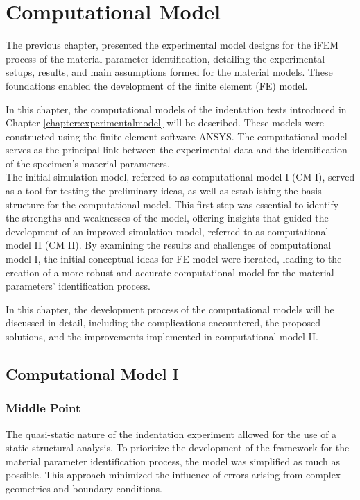 
\chapter{Computational Model} %
\label{chapter:computationalmodel} %

The previous chapter, presented the experimental model designs for the iFEM process of the material 
parameter identification, detailing the experimental setups, results, and main assumptions 
formed for the material models. These foundations enabled the development of the finite element (FE) model.

In this chapter, the computational models of the indentation tests introduced in Chapter \ref{chapter:experimentalmodel} 
will be described. These models were constructed using the finite element software ANSYS. 
The computational model serves as the principal link between the experimental data and the identification of the 
specimen's material parameters.\\  

The initial simulation model, referred to as computational model I (CM I), served as a tool 
for testing the preliminary ideas, as well as establishing the basis structure for 
the computational model. This first step was essential to identify the strengths and 
weaknesses of the model, offering insights that guided the development of an 
improved simulation model, referred to as computational model II (CM II). By examining the 
results and challenges of computational model I, the initial conceptual ideas for FE model 
were iterated, leading to the creation of a more robust and accurate computational model
for the material parameters' identification process.

In this chapter, the development process of the computational models will be discussed in detail, 
including the complications encountered, the proposed solutions, 
and the improvements implemented in computational model II.

\section{Computational Model I}
\label{section:cpI}
\subsection{Middle Point}
\label{subsection:mpcpI}
The quasi-static nature of the indentation experiment allowed for the use of a static 
structural analysis. To prioritize the development of the framework for the material 
parameter identification process, the model was simplified as much as possible.
This approach minimized the influence of errors arising from complex geometries and boundary conditions.

